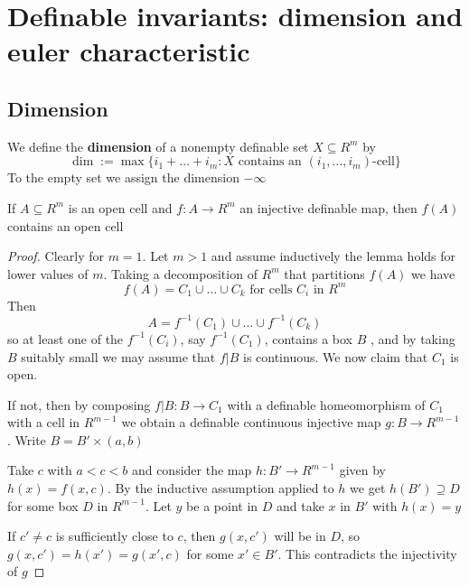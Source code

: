 \documentclass[11pt]{article}
\begin{document}
\section{Definable invariants: dimension and euler characteristic}
\label{sec:org0efd3de}

\subsection{Dimension}
\label{sec:orgf3eb7d8}
We define the \textbf{dimension} of a nonempty definable set \(X\subseteq R^m\) by
\begin{equation*}
\dim:=\max\{i_1+\dots+i_m:X\text{ contains an }(i_1,\dots,i_m)\text{-cell}\}
\end{equation*}
To the empty set we assign the dimension \(-\infty\)

\begin{lemma}[]
\label{4.1.2}
If \(A\subseteq R^m\) is an open cell and \(f:A\to R^m\) an injective definable map, then \(f(A)\) contains
an open cell
\end{lemma}

\begin{proof}
Clearly for \(m=1\). Let \(m>1\) and assume inductively the lemma holds for lower values
of \(m\). Taking a decomposition of \(R^m\) that partitions \(f(A)\) we have
\begin{equation*}
f(A)=C_1\cup\dots\cup C_k\text{ for cells $C_i$ in }R^m
\end{equation*}
Then
\begin{equation*}
A=f^{-1}(C_1)\cup\dots\cup f^{-1}(C_k)
\end{equation*}
so at least one of the \(f^{-1}(C_i)\), say \(f^{-1}(C_1)\), contains a box \(B\) , and by
taking \(B\) suitably small we may assume that \(f|B\) is continuous. We now claim that \(C_1\)
is open.

If not, then by composing \(f|B:B\to C_1\) with a definable homeomorphism of \(C_1\) with a
cell in \(R^{m-1}\) we obtain a definable continuous injective map \(g:B\to R^{m-1}\).
Write \(B=B'\times(a,b)\)

Take \(c\) with \(a<c<b\) and consider the map \(h:B'\to R^{m-1}\) given by \(h(x)=f(x,c)\). By
the inductive assumption applied to \(h\) we get \(h(B')\supseteq D\) for some box \(D\) in \(R^{m-1}\).
Let \(y\) be a point in \(D\) and take \(x\) in \(B'\) with \(h(x)=y\)

If \(c'\neq c\) is sufficiently close to \(c\), then \(g(x,c')\) will be in \(D\),
so \(g(x,c')=h(x')=g(x',c)\) for some \(x'\in B'\). This contradicts the injectivity of \(g\)
\end{proof}
\end{document}

